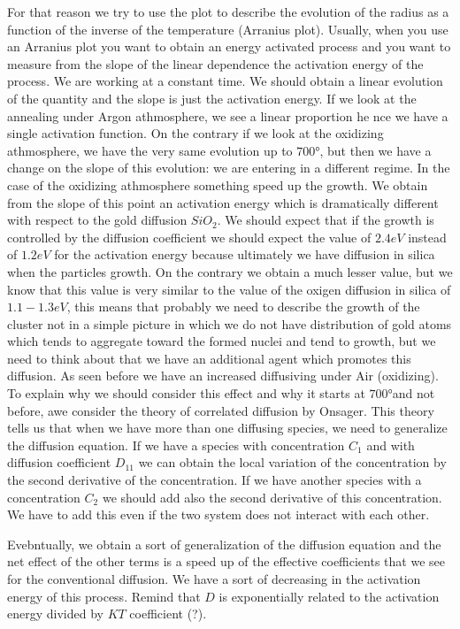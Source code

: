 \documentclass[../main/main.tex]{subfiles}
\begin{document}
For that reason we try to use the plot to describe the evolution of the radius as a function of the inverse of the temperature (Arranius plot). Usually, when you use an Arranius plot you want to obtain an energy activated process and you want to measure from the slope of the linear dependence the activation energy of the process.
We are working at a constant time.
We should obtain a linear evolution of the quantity and the slope is just the activation energy. If we look at the annealing under Argon athmosphere, we see a linear proportion he nce we have a single activation function. On the contrary if we look at the oxidizing athmosphere, we have the very same evolution up to \( 700° \), but then we have a change on the slope of this evolution: we are entering in a different regime. In the case of the oxidizing athmosphere something speed up the growth. We obtain from the slope of this point an activation energy which is dramatically different with respect to the gold diffusion \( SiO_2 \). We should expect that if the growth is controlled by the diffusion coefficient we should expect the value of \( 2.4 eV \) instead of \( 1.2 eV \) for the activation energy because ultimately we have diffusion in silica when the particles growth. On the contrary we obtain a much lesser value, but we know that this value is very similar to the value of the oxigen diffusion in silica of \( 1.1-1.3eV \), this means that probably we need to describe the growth of the cluster not in a simple picture in which we do not have distribution of gold atoms which tends to aggregate toward the formed nuclei and tend to growth, but we need to think about that we have an additional agent which promotes this diffusion. As seen before we have an increased diffusiving under Air (oxidizing). To explain why we should consider this effect and why it starts at \( 700° \)and not before, awe consider the theory of correlated diffusion by Onsager. This theory tells us that when we have more than one diffusing species, we need to generalize the diffusion equation.
If we have a species with concentration \( C_1 \) and with diffusion coefficient \( D_{11} \) we can obtain the local variation of the concentration by the second derivative of the concentration. If we have another species with a concentration \( C_2 \) we should add also the second derivative of this concentration. We have to add this even if the two system does not interact with each other.

Evebntually, we obtain a sort of generalization of the diffusion equation and the net effect of the other terms is a speed up of the effective coefficients that we see for the conventional diffusion. We have a sort of decreasing in the activation energy of this process. Remind that \( D \) is exponentially related to the activation energy divided by \( KT \) coefficient (?).
\end{document}
